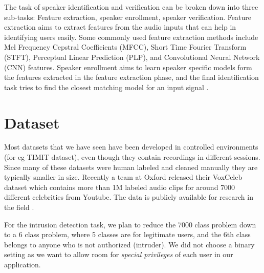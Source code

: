 \documentclass[letterpaper]{article}
\begin{document}
The task of speaker identification and verification can be broken down into three sub-tasks: Feature extraction, speaker enrollment, speaker verification.
Feature extraction aims to extract features from the audio inputs that can help in identifying users easily. Some commonly used feature extraction  methods include Mel Frequency Cepstral Coefficients (MFCC), Short Time Fourier Transform (STFT), Perceptual Linear Prediction (PLP), and Convolutional Neural Network (CNN) features.
Speaker enrollment aims to learn speaker specific models form the features extracted in the feature extraction phase, and the final identification task tries to find the closest matching model for an input signal \cite{sv-cnn}. 

\section{Dataset}
Most datasets that we have seen have been developed in controlled environments (for eg TIMIT dataset), even though they contain recordings in different sessions. Since many of these datasets were human labeled and cleaned manually they are typically smaller in size. Recently a team at Oxford released their VoxCeleb dataset which contains more than 1M labeled audio clips for around 7000 different celebrities from Youtube. The data is publicly available for research in the field \cite{voxCeleb}.


For the intrusion detection task, we plan to reduce the 7000 class problem down to a 6 class problem, where 5 classes are for legitimate users, and the 6th class belongs to anyone who is not authorized (intruder). We did not choose a binary setting as we want to allow room for \emph{special privileges} of each user in our application.
\end{document}
